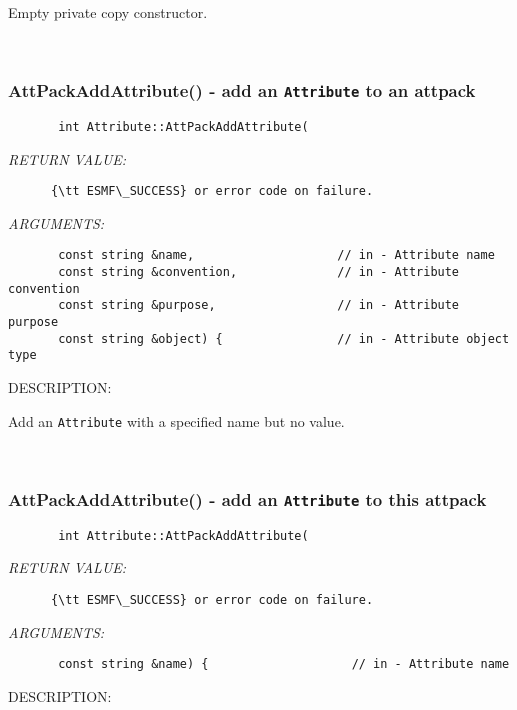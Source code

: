       Empty private copy constructor.
   
 
\mbox{}\hrulefill\
 
\subsubsection [AttPackAddAttribute()] {AttPackAddAttribute() - add an {\tt Attribute} to an attpack}


  
\begin{verbatim}       int Attribute::AttPackAddAttribute(\end{verbatim}{\em RETURN VALUE:}
\begin{verbatim}      {\tt ESMF\_SUCCESS} or error code on failure.
   \end{verbatim}{\em ARGUMENTS:}
\begin{verbatim}       const string &name,                    // in - Attribute name
       const string &convention,              // in - Attribute convention
       const string &purpose,                 // in - Attribute purpose
       const string &object) {                // in - Attribute object type 
   \end{verbatim}
{\sf DESCRIPTION:\\ }


       Add an {\tt Attribute} with a specified name but no value.
   
 
\mbox{}\hrulefill\
 
\subsubsection [AttPackAddAttribute()] {AttPackAddAttribute() - add an {\tt Attribute} to this attpack}


  
\begin{verbatim}       int Attribute::AttPackAddAttribute(\end{verbatim}{\em RETURN VALUE:}
\begin{verbatim}      {\tt ESMF\_SUCCESS} or error code on failure.
   \end{verbatim}{\em ARGUMENTS:}
\begin{verbatim}       const string &name) {                    // in - Attribute name
   \end{verbatim}
{\sf DESCRIPTION:\\ }


